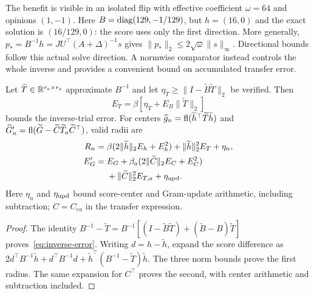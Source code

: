 The benefit is visible in an isolated flip with effective coefficient $\omega=64$ and opinions $(1,-1)$. Here $B=\operatorname{diag}(129,-1/129)$, but $h=(16,0)$ and the exact solution is $(16/129,0)$: the score uses only the first direction. More generally, $p_*=B^{-1}h=JU^\top(A+\Delta)^{-1}s$ gives $\|p_*\|_2\le2\sqrt{\omega}\|s\|_\infty$. Directional bounds follow this actual solve direction. A normwise comparator instead controls the whole inverse and provides a convenient bound on accumulated transfer error.

\begin{theorem}\label{thm:normwise}
Let $\widetilde T\in\mathbb R^{r_e\times r_e}$ approximate $B^{-1}$ and let $\eta_T\ge\|I-\widetilde B\widetilde T\|_2$ be verified. Then
\begin{equation}
 E_T=\beta[\eta_T+E_B\|\widetilde T\|_2]
 \label{eq:inverse-error}
\end{equation}
bounds the inverse-trial error. For centers $\widehat g_n=\operatorname{fl}(\widetilde h^\top\widetilde T\widetilde h)$ and $\widehat G'_n=\operatorname{fl}(\widetilde G-\widetilde C\widetilde T_a\widetilde C^\top)$, valid radii are
\begin{equation}
 \begin{aligned}
 R_n={}&\beta(2\|\widetilde h\|_2E_h+E_h^2)
       +\|\widetilde h\|_2^2E_T+\eta_n,\\
 E'_G={}&E_G+\beta_a(2\|\widetilde C\|_2E_C+E_C^2)\\
       &+\|\widetilde C\|_2^2E_{T,a}+\eta_{\rm upd}.
 \end{aligned}
 \label{eq:normwise}
\end{equation}
Here $\eta_n$ and $\eta_{\rm upd}$ bound score-center and Gram-update arithmetic, including subtraction; $C=C_{ea}$ in the transfer expression.
\end{theorem}
\begin{proof}
The identity $B^{-1}-\widetilde T=B^{-1}[(I-\widetilde B\widetilde T)+(\widetilde B-B)\widetilde T]$ proves~\eqref{eq:inverse-error}. Writing $d=h-\widetilde h$, expand the score difference as $2d^\top B^{-1}\widetilde h+d^\top B^{-1}d+\widetilde h^\top(B^{-1}-\widetilde T)\widetilde h$. The three norm bounds prove the first radius. The same expansion for $C^\top$ proves the second, with center arithmetic and subtraction included.
\end{proof}

